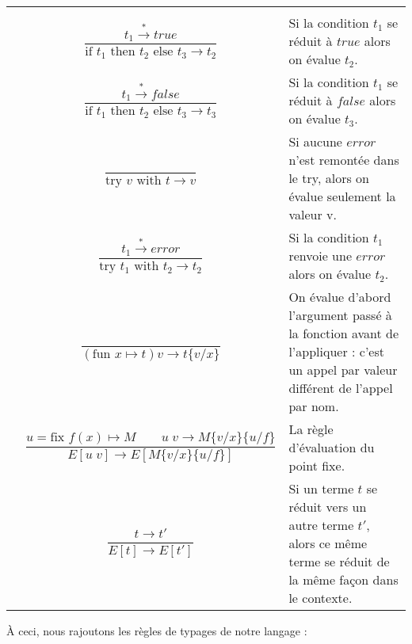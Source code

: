 \documentclass[11pt, a4paper, notitlepage]{article}
\newcommand\tab{{\hspace*{12.5mm}}}
\begin{document}
\begin{center}
   \renewcommand{\arraystretch}{2}
   \begin{tabular}{|lcp{}|}
      \hline
      & &\\[-5mm]
      & $\dfrac{t_1 \xrightarrow{*} true}{\text{if } t_1 \text{ then } t_2 \text{ else } t_3 \to t_2}$ & Si la condition $t_1$ se réduit à $true$ alors on évalue $t_2$.\\
      & $\dfrac{t_1 \xrightarrow{*} false}{\text{if } t_1 \text{ then } t_2 \text{ else } t_3 \to t_3}$ & Si la condition $t_1$ se réduit à $false$ alors on évalue $t_3$.\\
      & $\dfrac{}{\text{try } v \text{ with } t \to v}$ & Si aucune $error$ n'est remontée dans le try, alors on évalue seulement la valeur v.\\
      & $\dfrac{t_1 \xrightarrow{*} error}{\text{try } t_1 \text{ with } t_2 \to t_2}$ & Si la condition $t_1$ renvoie une $error$ alors on évalue $t_2$.\\
      & $\dfrac{}{(\text{fun  }x \mapsto t)v \to t\{v/x\}}$ & On évalue d'abord l'argument passé à la fonction avant de l'appliquer : c'est un appel par valeur différent de l'appel par nom.\\
      & $\dfrac{u = \text{fix }f(x) \mapsto M \qquad u \; v \to M \{v/x\}\{u/f\}}{E[u \; v] \to E[M \{v/x\}\{u/f\}]}$& La règle d'évaluation du point fixe.\\
      & $\dfrac{t \to t'}{E[t] \to E[t']}$ & Si un terme $t$ se réduit vers un autre terme $t'$, alors ce même terme se réduit de la même façon dans le contexte.\\[5mm]
      \hline
   \end{tabular}
   \renewcommand{\arraystretch}{1}
\end{center}
\newpage
\tab À ceci, nous rajoutons les règles de typages de notre langage :
\end{document}
